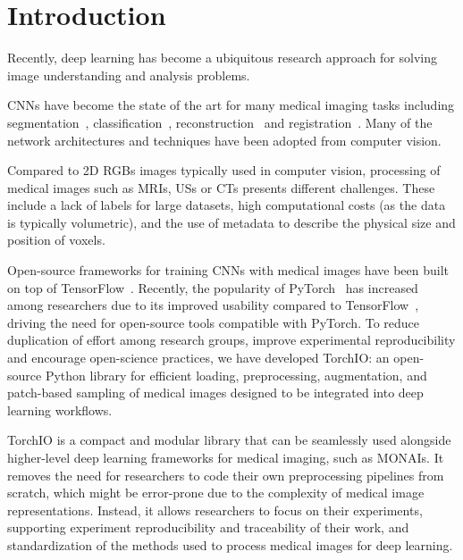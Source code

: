 \section{Introduction}

Recently, deep learning has become a ubiquitous research approach for solving image understanding and analysis problems.

\Acp{CNN} have become the state of the art for many medical imaging tasks including segmentation~\cite{cicek_3d_2016}, classification~\cite{lu_multimodal_2018}, reconstruction~\cite{chen_variable-density_2018} and registration~\cite{shan_unsupervised_2018}.
Many of the network architectures and techniques have been adopted from computer vision.

Compared to 2D \acp{RGB} images typically used in computer vision, processing of medical images such as \acp{MRI}, \acp{US} or \acp{CT} presents different challenges.
These include a lack of labels for large datasets, high computational costs (as the data is typically volumetric), and the use of metadata to describe the physical size and position of voxels.

Open-source frameworks for training \acp{CNN} with medical images have been built on top of TensorFlow~\cite{abadi_tensorflow_2016,pawlowski_dltk_2017,gibson_niftynet_2018}.
Recently, the popularity of PyTorch~\cite{paszke_pytorch_2019} has increased among researchers due to its improved usability compared to TensorFlow~\cite{he_state_2019}, driving the need for open-source tools compatible with PyTorch.
To reduce duplication of effort among research groups, improve experimental reproducibility and encourage open-science practices, we have developed TorchIO: an open-source Python library for efficient loading, preprocessing, augmentation, and patch-based sampling of medical images designed to be integrated into deep learning workflows.

TorchIO is a compact and modular library that can be seamlessly used alongside higher-level deep learning frameworks for medical imaging, such as \acp{MONAI}.
It removes the need for researchers to code their own preprocessing pipelines from scratch, which might be error-prone due to the complexity of medical image representations.
Instead, it allows researchers to focus on their experiments, supporting experiment reproducibility and traceability of their work, and standardization of the methods used to process medical images for deep learning.
